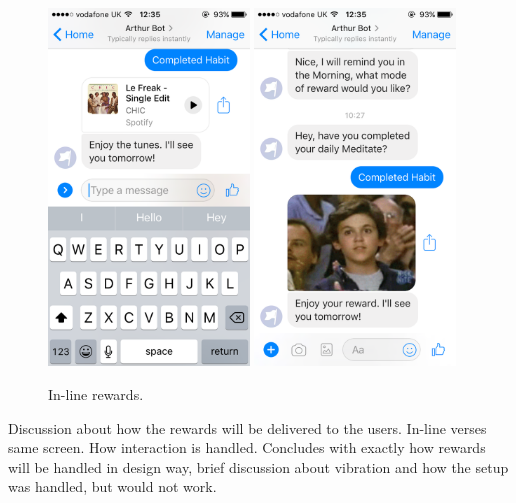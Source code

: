 \begin{figure}[H]
  \centering
  \includegraphics[width=2.1in]{../resources/design/reward-audio-inline.png}
  \hspace{10px}
  \includegraphics[width=2.1in]{../resources/design/reward-visual-inline.png}
  \caption{In-line rewards.}
  \label{fig:rewards_inline}
\end{figure}

Discussion about how the rewards will be delivered to the users. In-line verses same screen. How interaction is handled. Concludes with exactly how rewards will be handled in design way, brief discussion about vibration and how the setup was handled, but would not work.

